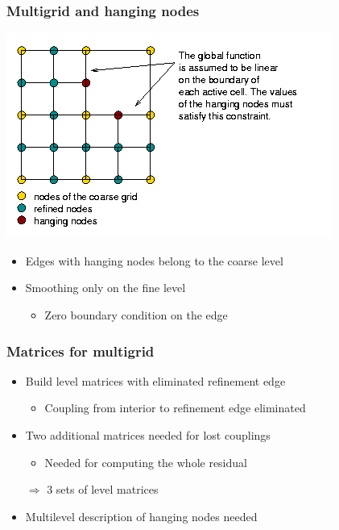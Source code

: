 \begin{frame}
  \frametitle{Multigrid and hanging nodes}
  \begin{center}
    \includegraphics[height=.5\textheight]{graph/hanging_nodes}    
  \end{center}
  \begin{itemize}
  \item Edges with hanging nodes belong to the coarse level
  \item Smoothing only on the fine level
    \begin{itemize}
    \item Zero boundary condition on the edge
    \end{itemize}
  \end{itemize}
\end{frame}

\begin{frame}
  \frametitle{Matrices for multigrid}
  \begin{itemize}
  \item Build level matrices with eliminated refinement edge
    \begin{itemize}
    \item Coupling from interior to refinement edge eliminated
    \end{itemize}
  \item Two additional matrices needed for lost couplings
    \begin{itemize}
    \item Needed for computing the whole residual
    \end{itemize}
  \item[$\Rightarrow$] 3 sets of level matrices
  \item Multilevel description of hanging nodes needed
  \end{itemize}
\end{frame}

